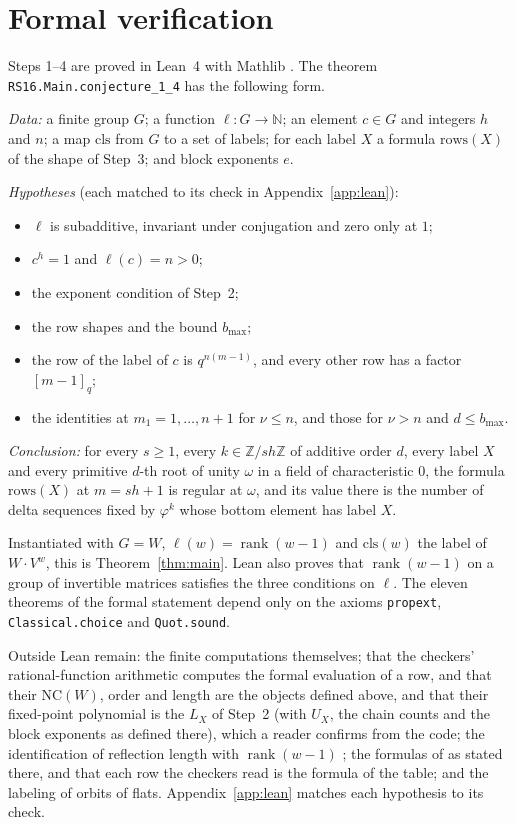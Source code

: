 \documentclass[11pt]{article}
\theoremstyle{definition}
\newcommand{\NC}{\mathrm{NC}}
\newcommand{\Z}{\mathbb{Z}}
\begin{document}
\section{Formal verification}\label{sec:lean}

Steps 1--4 are proved in Lean~4 \cite{Lean} with Mathlib \cite{Mathlib}.
The theorem \texttt{RS16.Main.conjecture\_1\_4} has the following form.

\emph{Data:} a finite group $G$; a function $\ell:G\to\mathbb N$; an element
$c\in G$ and integers $h$ and $n$; a map $\mathrm{cls}$ from $G$ to a set of
labels; for each label $X$ a formula $\mathrm{rows}(X)$ of the shape of
Step~3; and block exponents $e$.

\emph{Hypotheses} (each matched to its check in Appendix~\ref{app:lean}):
\begin{itemize}
\item $\ell$ is subadditive, invariant under conjugation and zero only at $1$;
\item $c^h=1$ and $\ell(c)=n>0$;
\item the exponent condition of Step~2;
\item the row shapes and the bound $b_{\max}$;
\item the row of the label of $c$ is $q^{n(m-1)}$, and every other row has a
factor $[m-1]_q$;
\item the identities at $m_1=1,\dots,n+1$ for $\nu\le n$, and those for
$\nu>n$ and $d\le b_{\max}$.
\end{itemize}

\emph{Conclusion:} for every $s\ge1$, every $k\in\Z/sh\Z$ of additive order
$d$, every label $X$ and every primitive $d$-th root of unity $\omega$ in a
field of characteristic $0$, the formula $\mathrm{rows}(X)$ at $m=sh+1$ is
regular at $\omega$, and its value there is the number of delta sequences
fixed by $\varphi^k$ whose bottom element has label $X$.

Instantiated with $G=W$, $\ell(w)=\operatorname{rank}(w-1)$ and
$\mathrm{cls}(w)$ the label of $W\cdot V^w$, this is
Theorem~\ref{thm:main}. Lean also proves that $\operatorname{rank}(w-1)$ on
a group of invertible matrices satisfies the three conditions on $\ell$.
The eleven theorems of the formal statement depend only on the axioms
\texttt{propext}, \texttt{Classical.choice} and \texttt{Quot.sound}.

Outside Lean remain: the finite computations themselves; that the checkers'
rational-function arithmetic computes the formal evaluation of a row, and
that their $\NC(W)$, order and length are the objects defined above, and
that their fixed-point polynomial is the $L_X$ of Step~2 (with $U_X$, the
chain counts and the block exponents as defined there), which a reader
confirms from the code; the identification of reflection length with
$\operatorname{rank}(w-1)$ \cite[Lemma~2]{Car}; the formulas of
\cite[\S3.6]{RS} as stated there, and that each row the checkers read is
the formula of the table; and the labeling of orbits of flats.
Appendix~\ref{app:lean} matches each hypothesis to its check.
\end{document}
